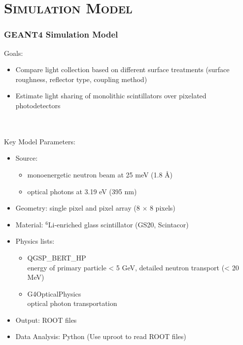 \documentclass[xcolor=x11names, compress, handout]{beamer}
\renewcommand{\(}{\begin{columns}}
\renewcommand{\)}{\end{columns}}
\newcommand{\<}[1]{\begin{column}{#1}}
\renewcommand{\>}{\end{column}}
\begin{document}
\section{\scshape Simulation Model}
\begin{frame}
\frametitle{GEANT4 Simulation Model}
\scriptsize
Goals:
\begin{itemize}
\item Compare light collection based on different surface treatments (surface roughness, reflector type, coupling method) 
\item Estimate light sharing of monolithic scintillators over pixelated photodetectors
\end{itemize}
\ \\
\ \\
Key Model Parameters:
\begin{itemize}
\item Source: 
  \begin{itemize}
    \scriptsize
  \item monoenergetic neutron beam at 25 meV (1.8 \AA) 
  \item optical photons at 3.19 eV (395 nm)
  \end{itemize}
\item Geometry: single pixel and pixel array (8 $\times$ 8 pixels)
\item Material: $^6$Li-enriched glass scintillator (GS20, Scintacor)
\item Physics lists:
  \begin{itemize}
    \scriptsize
  \item QGSP\_BERT\_HP \\ energy of primary particle < 5 GeV, detailed neutron transport (< 20 MeV) 
  \item G4OpticalPhysics \\ optical photon transportation
  \end{itemize}
\item Output: ROOT files
\item Data Analysis: Python (Use uproot to read ROOT files)
\end{itemize}
\end{frame}
\end{document}
